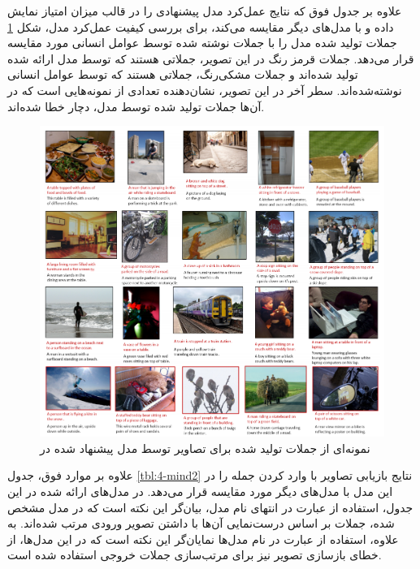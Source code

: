 علاوه بر جدول فوق که نتایج عمل‌کرد مدل پیشنهادی را در قالب میزان امتیاز  نمایش داده و با مدل‌های دیگر مقایسه می‌کند، برای بررسی کیفیت عمل‌کرد مدل، شکل \ref{fig:4-mind1p} جملات تولید شده مدل را با جملات نوشته شده توسط عوامل انسانی مورد مقایسه قرار می‌دهد. جملات قرمز رنگ در این تصویر، جملاتی هستند که توسط مدل ارائه شده تولید شده‌اند و جملات مشکی‌رنگ، جملاتی هستند که توسط عوامل انسانی نوشته‌شده‌اند. سطر آخر در این تصویر، نشان‌دهنده تعدادی از نمونه‌هایی است که در آن‌ها جملات تولید شده توسط مدل، دچار خطا شده‌اند.



\begin{figure}[h]
	\centering
	\includegraphics[scale=0.4]{Imgs/mindsEyeRes1.png}
	\caption{نمونه‌ای از جملات تولید شده برای تصاویر توسط مدل پیشنهاد شده در \cite{chen2015mind}}
	\label{fig:4-mind1p}
\end{figure}


علاوه بر موارد فوق، جدول \ref{tbl:4-mind2} نتایج بازیابی تصاویر با وارد کردن جمله را در این مدل با مدل‌های دیگر مورد مقایسه قرار می‌دهد. در مدل‌های ارائه شده در این جدول، استفاده از عبارت  در انتهای نام مدل، بیان‌گر این نکته است که در مدل مشخص شده، جملات بر اساس درست‌نمایی آن‌ها با داشتن تصویر ورودی مرتب شده‌اند. به علاوه، استفاده از عبارت   در نام مدل‌ها نمایان‌گر این نکته است که در این مدل‌ها، از خطای بازسازی تصویر نیز برای مرتب‌سازی جملات خروجی استفاده شده است.


